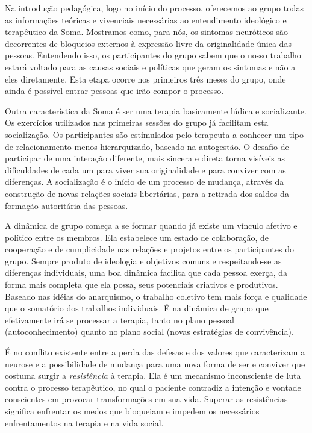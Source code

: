 Na introdução pedagógica, logo no início do processo, oferecemos ao
grupo todas as informações teóricas e vivenciais necessárias ao
entendimento ideológico e terapêutico da Soma. Mostramos como, para nós,
os sintomas neuróticos são decorrentes de bloqueios externos à expressão
livre da originalidade única das pessoas. Entendendo isso, os
participantes do grupo sabem que o nosso trabalho estará voltado para as
causas sociais e políticas que geram os sintomas e não a eles
diretamente. Esta etapa ocorre nos primeiros três meses do grupo, onde
ainda é possível entrar pessoas que irão compor o processo.

Outra característica da Soma é ser uma terapia basicamente lúdica e
socializante. Os exercícios utilizados nas primeiras sessões do grupo já
facilitam esta socialização. Os participantes são estimulados pelo
terapeuta a conhecer um tipo de relacionamento menos hierarquizado,
baseado na autogestão. O desafio de participar de uma interação
diferente, mais sincera e direta torna visíveis as dificuldades de cada
um para viver sua originalidade e para conviver com as diferenças. A
socialização é o início de um processo de mudança, através da construção
de novas relações sociais libertárias, para a retirada dos saldos da
formação autoritária das pessoas.

A dinâmica de grupo começa a se formar quando já existe um vínculo
afetivo e político entre os membros. Ela estabelece um estado de
colaboração, de cooperação e de cumplicidade nas relações e projetos
entre os participantes do grupo. Sempre produto de ideologia e objetivos
comuns e respeitando-se as diferenças individuais, uma boa dinâmica
facilita que cada pessoa exerça, da forma mais completa que ela possa,
seus potenciais criativos e produtivos. Baseado nas idéias do
anarquismo, o trabalho coletivo tem mais força e qualidade que o
somatório dos trabalhos individuais. É na dinâmica de grupo que
efetivamente irá se processar a terapia, tanto no plano pessoal
(autoconhecimento) quanto no plano social (novas estratégias de
convivência).

É no conflito existente entre a perda das defesas e dos valores que
caracterizam a neurose e a possibilidade de mudança para uma nova forma
de ser e conviver que costuma surgir a \emph{resistência} à terapia. Ela
é um mecanismo inconsciente de luta contra o processo terapêutico, no
qual o paciente contradiz a intenção e vontade conscientes em provocar
transformações em sua vida. Superar as resistências significa enfrentar
os medos que bloqueiam e impedem os necessários enfrentamentos na
terapia e na vida social.

